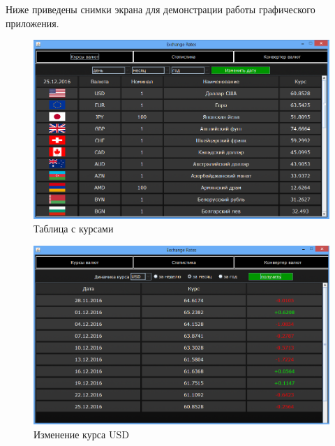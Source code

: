 \documentclass[a4paper]{article}
\begin{document}
Ниже приведены снимки экрана для демонстрации работы графического приложения.

\begin{figure}[H]
	\begin{center}
		\includegraphics[scale = 0.7]{screen/GUI_1.png}
		\caption{Таблица с курсами} 
		\label{pic:pic_name} %
	\end{center}
\end{figure}

\begin{figure}[H]
	\begin{center}
		\includegraphics[scale = 0.7]{screen/GUI_2.png}
		\caption{Изменение курса USD} 
		\label{pic:pic_name} %
	\end{center}
\end{figure}
\end{document}
